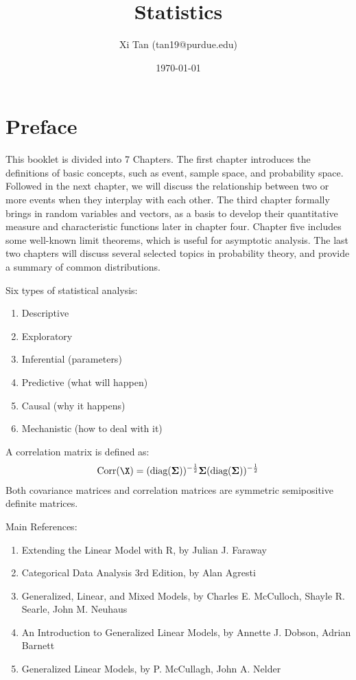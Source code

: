 \documentclass{memoir}
\title{Statistics}
\author{Xi Tan (tan19@purdue.edu)}
\date{\today}
\begin{document}
\maketitle
\tableofcontents

\newpage
\chapter*{Preface}
This booklet is divided into 7 Chapters. The first chapter introduces the definitions of basic concepts, such as event, sample space, and probability space. Followed in the next chapter, we will discuss the relationship between two or more events when they interplay with each other. The third chapter formally brings in random variables and vectors, as a basis to develop their quantitative measure and characteristic functions later in chapter four. Chapter five includes some well-known limit theorems, which is useful for asymptotic analysis. The last two chapters will discuss several selected topics in probability theory, and provide a summary of common distributions.

Six types of statistical analysis:
\begin{enumerate}
	\item Descriptive
	\item Exploratory
	\item Inferential (parameters)
	\item Predictive (what will happen)
	\item Causal (why it happens)
	\item Mechanistic (how to deal with it)
\end{enumerate}


A correlation matrix is defined as:
\begin{align}
	\text{Corr}(\X) = (\text{diag}(\bSigma))^{-\frac{1}{2}} \bSigma (\text{diag}(\bSigma))^{-\frac{1}{2}}
\end{align}
Both covariance matrices and correlation matrices are symmetric semipositive definite matrices.


Main References:
\begin{enumerate}
	\item Extending the Linear Model with R, by Julian J. Faraway
	\item Categorical Data Analysis 3rd Edition, by Alan Agresti
	\item Generalized, Linear, and Mixed Models, by Charles E. McCulloch, Shayle R. Searle, John M. Neuhaus
	\item An Introduction to Generalized Linear Models, by Annette J. Dobson, Adrian Barnett
	\item Generalized Linear Models, by P. McCullagh, John A. Nelder
\end{enumerate}
\end{document}
